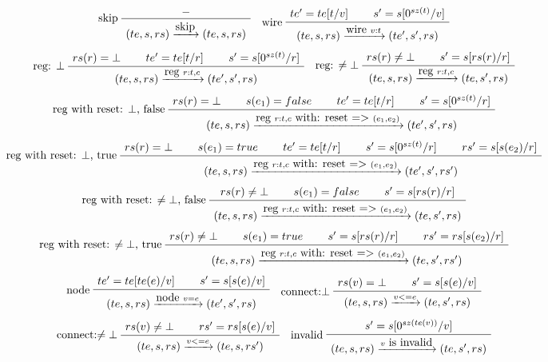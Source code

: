 \begin{table}
  \footnotesize
  \begin{gather*}
    \infer[skip]
    {\seqq{(te, s, rs) \xrightarrow{\mbox{skip}} (te, s, rs)}}
    {\seqq{-}}
    \quad
    \inferii[wire]
    {\seqq{(te, s, rs) \xrightarrow{\mbox{wire } v: t} (te', s', rs)}}
   {\seqq{te' = te [t/v]}} {\seqq{s' = s [0^{sz(t)}/v]}}
    \\[1ex]
    \inferiii[reg: $\bot$]
    {\seqq{(te, s, rs) \xrightarrow{\mbox{reg } r: t, c} (te', s', rs)}}
   {\seqq{rs(r) = \bot}} {\seqq{te' = te [t/r]}} {\seqq{s' = s[0^{sz(t)}/r]}}
    \quad
    \inferii[reg: $\neq\bot$]
    {\seqq{(te, s, rs) \xrightarrow{\mbox{reg } r: t, c} (te, s', rs)}}
   {\seqq{rs(r) \neq \bot}} {\seqq{s' = s[rs(r)/r]}}
    \\[1ex]
    \inferiv[reg with reset: $\bot$, false]
    {\seqq{(te, s, rs) \xrightarrow{\mbox{reg } r: t, c \mbox{ with: reset => }(e_1, e_2)} (te', s', rs)}}
   {\seqq{rs(r) = \bot}} {\seqq{ s(e_1)= false}}  {\seqq{te' = te [t/r]}} {\seqq{s' = s[0^{sz(t)}/r]}}
    \\[1ex]
    \inferv[reg with reset: $\bot$, true]
    {\seqq{(te, s, rs) \xrightarrow{\mbox{reg } r: t, c \mbox{ with: reset => }(e_1, e_2)} (te', s', rs')}}
   {\seqq{rs(r) = \bot}} {\seqq{ s(e_1)= true}}  {\seqq{te' = te [t/r]}} {\seqq{s' = s[0^{sz(t)}/r]}} {\seqq{rs' = s[s(e_2)/r]}}
    \\[1ex]
    \inferiii[reg with reset: $\neq\bot$, false]
    {\seqq{(te, s, rs) \xrightarrow{\mbox{reg } r: t, c \mbox{ with: reset => }(e_1, e_2)} (te, s', rs)}}
   {\seqq{rs(r) \neq \bot}} {\seqq{ s(e_1)= false}} {\seqq{s' = s[rs(r)/r]}}
    \\[1ex]
    \inferiv[reg with reset: $\neq\bot$, true]
    {\seqq{(te, s, rs) \xrightarrow{\mbox{reg } r: t, c \mbox{ with: reset => }(e_1, e_2)} (te, s', rs')}}
   {\seqq{rs(r) \neq \bot}} {\seqq{ s(e_1)= true}} {\seqq{s' = s[rs(r)/r]}} {\seqq{rs' = rs[s(e_2)/r]}}
    \\[1ex]
    \inferii[node]
    {\seqq{(te, s, rs) \xrightarrow{\mbox{node } v = e} (te', s', rs)}}
   {\seqq{te' = te[te(e)/v]}} {\seqq{s' = s[s(e)/v]}}
    \quad
    \inferii[connect:$\bot$]
    {\seqq{(te, s, rs) \xrightarrow{v <= e} (te, s', rs)}}
   {\seqq{rs(v) = \bot}} {\seqq{s' = s[s(e)/v]}}
    \\[1ex]    
    \inferii[connect:$\neq \bot$]
    {\seqq{(te, s, rs) \xrightarrow{v <= e} (te, s, rs')}}
   {\seqq{rs(v) \neq \bot}} {\seqq{rs' = rs[s(e)/v]}}
  \quad
    \infer[invalid]
    {\seqq{(te, s, rs) \xrightarrow{v \mbox{ is invalid}} (te, s', rs)}}
   {\seqq{s' = s[0^{sz(te(v))}/v]}}
  \end{gather*}
  \caption{Operational semantics of LoFIRRTL statements.}
  \label{tab:lofirrtl-sem}
\end{table}


